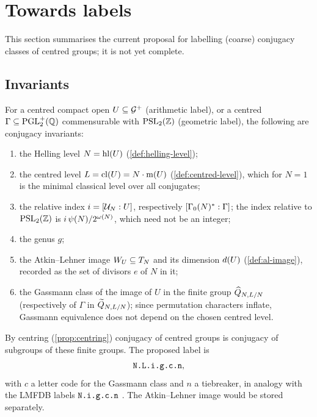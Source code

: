 \section{Towards labels}\label{sec:labels}

This section summarises the current proposal for labelling (coarse)
conjugacy classes of centred groups; it is not yet complete.

\subsection{Invariants}
For a centred compact open $U \subseteq \mathcal{G}^{+}$ (arithmetic label),
or a centred $\Gamma \subseteq \mathrm{PGL}_{2}^{+}(\mathbb{Q})$ commensurable with
$\PSL{2}{\ZZ}$ (geometric label), the following are conjugacy invariants:
\begin{enumerate}
\item the Helling level $N = \operatorname{hl}(U)$ (\cref{def:helling-level});
\item the centred level $L = \operatorname{cl}(U) = N\cdot\operatorname{m}(U)$
  (\cref{def:centred-level}), which for $N = 1$ is the minimal classical
  level over all conjugates;
\item the relative index $i = [\mathcal{U}_{N}:U]$, respectively
  $\Index{\GammaZeroStar{N}}{\Gamma}$; the index relative to $\PSL{2}{\ZZ}$
  is $i\,\psi(N)/2^{\omega(N)}$, which need not be an
  integer;
\item the genus $g$;
\item the Atkin--Lehner image $W_{U} \subseteq T_{N}$ and its
  dimension $d(U)$ (\cref{def:al-image}), recorded as the set of
  divisors $e$ of $N$ in it;
\item the Gassmann class of the image of $U$ in the finite group
  $\widehat{Q}_{N,L/N}$ (respectively of $\Gamma$ in
  $\widetilde{Q}_{N,L/N}$); since permutation characters inflate,
  Gassmann equivalence does not depend on the chosen centred level.
\end{enumerate}
By centring (\cref{prop:centring}) conjugacy of centred groups is
conjugacy of subgroups of these finite groups. The proposed label is
\[
  \texttt{N.L.i.g.c.n},
\]
with $c$ a letter code for the Gassmann class and $n$ a tiebreaker, in
analogy with the LMFDB labels $\texttt{N.i.g.c.n}$ \cite{LMFDB}. The
Atkin--Lehner image would be stored separately.

